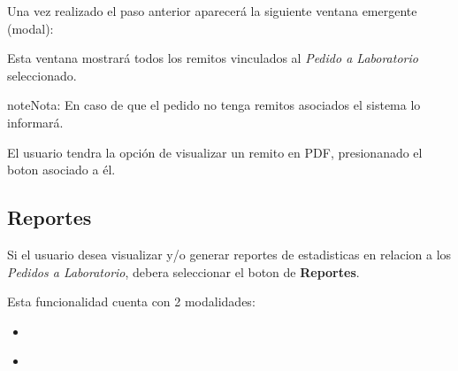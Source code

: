 \documentclass[a4paper,10pt,spanish]{sphinxmanual}
\begin{document}

Una vez realizado el paso anterior aparecerá la siguiente ventana emergente (modal):


Esta ventana mostrará todos los remitos vinculados al \emph{Pedido a Laboratorio} seleccionado.

\begin{notice}{note}{Nota:}
En caso de que el pedido no tenga remitos asociados el sistema lo informará.
\end{notice}

El usuario tendra la opción de visualizar un remito en PDF, presionanado el boton  asociado a él.



\subsection{Reportes}
\label{pedidosalab:reportes-pl}\label{pedidosalab:reportes}
Si el usuario desea visualizar y/o generar reportes de estadisticas en relacion a los \emph{Pedidos a Laboratorio}, debera seleccionar el boton de \textbf{Reportes}.


Esta funcionalidad cuenta con 2 modalidades:
\begin{itemize}
\item {} 
{\hyperref[pedidosalab:top10\string-meds\string-pl]{}}

\item {} 
{\hyperref[pedidosalab:top10\string-peds\string-pl]{}}

\end{itemize}
\end{document}
